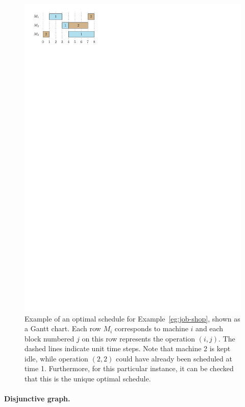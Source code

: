\documentclass[a4paper]{report}
\theoremstyle{definition}
\theoremstyle{plain}
\begin{document}
\begin{figure}
  \centering
  \includegraphics[scale=1]{figures/job-shop-delay.pdf}
  \caption{Example of an optimal schedule for Example~\ref{eg:job-shop}, shown
    as a Gantt chart. Each row $M_{i}$ corresponds to machine $i$ and each block
    numbered $j$ on this row represents the operation $(i,j)$. The dashed lines
    indicate unit time steps. Note that machine 2 is kept idle, while operation
    $(2,2)$ could have already been scheduled at time 1. Furthermore, for this
    particular instance, it can be checked that this is the unique optimal
    schedule.}
  \label{fig:job-shop-delay}
\end{figure}

\paragraph{Disjunctive graph.}
\end{document}

